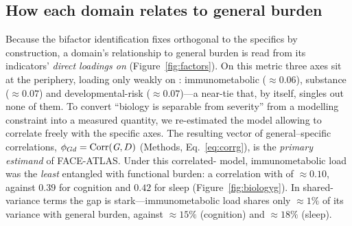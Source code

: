 \subsection{How each domain relates to general burden}\label{subsec:biologyg}

Because the bifactor identification fixes \Gfac{} orthogonal to the specifics by
construction, a domain's relationship to general burden is read from its indicators'
\emph{direct loadings on \Gfac{}} (Figure~\ref{fig:factors}). On this metric three axes
sit at the periphery, loading only weakly on \Gfac{}: immunometabolic ($\approx 0.06$),
substance ($\approx 0.07$) and developmental-risk ($\approx 0.07$)---a near-tie that, by
itself, singles out none of them. To convert ``biology is separable from severity'' from a
modelling constraint into a measured quantity, we re-estimated the model allowing \Gfac{}
to correlate freely with the specific axes. The resulting vector of general--specific
correlations, $\phi_{Gd}=\operatorname{Corr}(\textit{G},D)$ (Methods, Eq.~\ref{eq:corrg}), is
the \emph{primary estimand} of FACE-ATLAS. Under this correlated-\Gfac{} model,
immunometabolic load was the \emph{least} entangled with functional burden: a correlation
with \Gfac{} of $\approx 0.10$, against $0.39$ for cognition and $0.42$ for sleep
(Figure~\ref{fig:biologyg}). In shared-variance terms the gap is stark---immunometabolic
load shares only $\approx 1\%$ of its variance with general burden, against $\approx 15\%$
(cognition) and $\approx 18\%$ (sleep).

